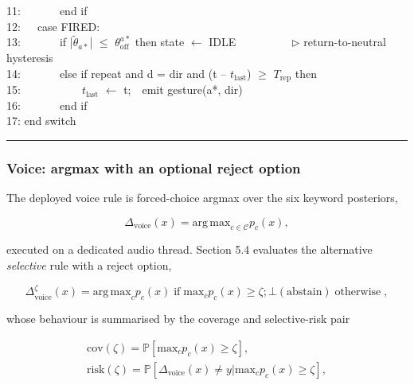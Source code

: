 \begin{algorithm}[htbp]
{11:~~~~~~~end if \\
12:~~~case FIRED: \\
13:~~~~~~~if |$\tilde{\theta }_{a*}$| $\leq$ $\theta_{\mathrm{off}}^{a*}$ then state $\leftarrow$ IDLE~~~~~~~~~~$\triangleright$ return-to-neutral hysteresis \\
14:~~~~~~~else if repeat and d = dir and (t -- $t_{\mathrm{last}}$) $\geq$ $T_{\mathrm{rep}}$ then \\
15:~~~~~~~~~~~$t_{\mathrm{last}}$ $\leftarrow$ t;~~emit gesture(a*, dir) \\
16:~~~~~~~end if \\
17: end switch
\par}
\vspace{3pt}\hrule
\end{algorithm}

\subsubsection{Voice: argmax with an optional reject option}

The deployed voice rule is forced-choice argmax over the six keyword posteriors,

\begin{equation}
\label{eq:131}
\Delta _{\mathrm{voice}}(x) = \mathrm{arg\,\mathrm{max}}_{c \in \mathcal{C}} p_c(x),
\end{equation}

executed on a dedicated audio thread. Section 5.4 evaluates the alternative \emph{selective} rule with a reject option,

\begin{equation}
\label{eq:132}
\Delta _{\mathrm{voice}}^{\zeta} (x) = \mathrm{arg\,\mathrm{max}}_c p_c(x) \;\text{if}\; \mathrm{max}_c p_c(x) \geq \zeta ; \bot (\text{abstain}) \;\text{otherwise}\;,
\end{equation}

whose behaviour is summarised by the coverage and selective-risk pair

\begin{equation}
\label{eq:133}
\begin{aligned}
\mathrm{cov}(\zeta ) = \mathbb{P}[ \mathrm{max}_c p_c(x) \geq \zeta ], \\
\mathrm{risk}(\zeta ) = \mathbb{P}[ \Delta _{\mathrm{voice}}(x) \neq y | \mathrm{max}_c p_c(x) \geq \zeta ] ,
\end{aligned}
\end{equation}

